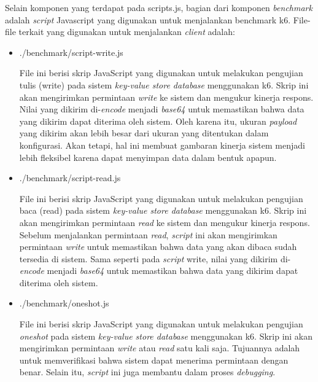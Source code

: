 Selain komponen yang terdapat pada scripts.js, bagian dari komponen \textit{benchmark} adalah \textit{script} Javascript yang digunakan untuk menjalankan benchmark k6. File-file terkait yang digunakan untuk menjalankan \textit{client} adalah:

\begin{itemize}
  \item ./benchmark/script-write.js

  File ini berisi skrip JavaScript yang digunakan untuk melakukan pengujian tulis (write) pada sistem \textit{key-value store database} menggunakan k6. Skrip ini akan mengirimkan permintaan \textit{write} ke sistem dan mengukur kinerja respons. Nilai yang dikirim di-\textit{encode} menjadi \textit{base64} untuk memastikan bahwa data yang dikirim dapat diterima oleh sistem. Oleh karena itu, ukuran \textit{payload} yang dikirim akan lebih besar dari ukuran yang ditentukan dalam konfigurasi. Akan tetapi, hal ini membuat gambaran kinerja sistem menjadi lebih fleksibel karena dapat menyimpan data dalam bentuk apapun.

  \item ./benchmark/script-read.js
  
  File ini berisi skrip JavaScript yang digunakan untuk melakukan pengujian baca (read) pada sistem \textit{key-value store database} menggunakan k6. Skrip ini akan mengirimkan permintaan \textit{read} ke sistem dan mengukur kinerja respons. Sebelum menjalankan permintaan \textit{read}, \textit{script} ini akan mengirimkan permintaan \textit{write} untuk memastikan bahwa data yang akan dibaca sudah tersedia di sistem. Sama seperti pada \textit{script} write, nilai yang dikirim di-\textit{encode} menjadi \textit{base64} untuk memastikan bahwa data yang dikirim dapat diterima oleh sistem.

  \item ./benchmark/oneshot.js
  
  File ini berisi skrip JavaScript yang digunakan untuk melakukan pengujian \textit{oneshot} pada sistem \textit{key-value store database} menggunakan k6. Skrip ini akan mengirimkan permintaan \textit{write} atau \textit{read} satu kali saja. Tujuannya adalah untuk memverifikasi bahwa sistem dapat menerima permintaan dengan benar. Selain itu, \textit{script} ini juga membantu dalam proses \textit{debugging}.
\end{itemize}
